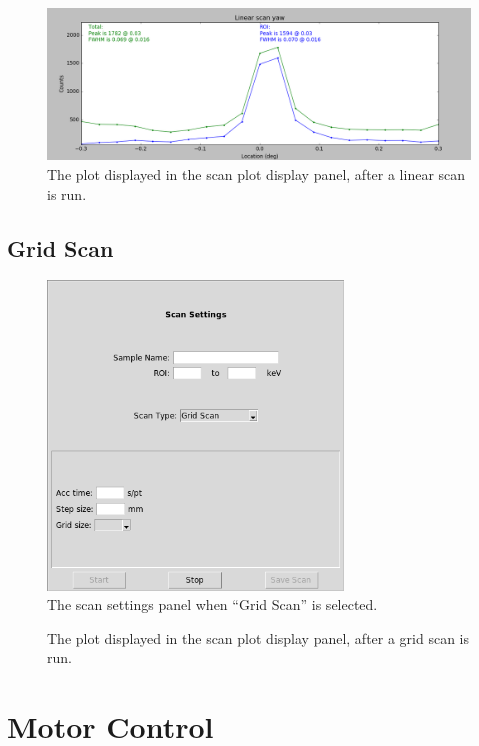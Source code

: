 \begin{figure}
\centering
\includegraphics[width=\textwidth]{linplot.png}
\caption{\label{fig:linplot} The plot displayed in the scan plot display panel, after a linear scan is run.}
\end{figure}


\subsection{Grid Scan}

\begin{figure}
\centering
\includegraphics[width=0.7\textwidth]{gridscan.png}
\caption{\label{fig:gridscan} The scan settings panel when ``Grid Scan'' is selected.}
\end{figure}

\begin{figure}
\centering
\caption{\label{fig:gridplot} The plot displayed in the scan plot display panel, after a grid scan is run.}
\end{figure}

\section{Motor Control}

